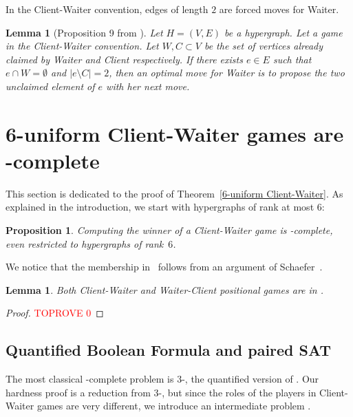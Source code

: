 \documentclass{article}
\newcommand{\PS}{\lang{Paired~SAT}\xspace}
\newcommand{\hyp}{H}
\newcommand{\WS}{E}
\newcommand{\som}{V}
\newcommand{\hxf}{\hyp = (\som, \WS)}
\newcommand{\QBF}{\lang{QBF}\xspace}
\newcommand{\hedges}{edges\xspace}
\newtheorem{lemma}[theorem]{Lemma}
\newtheorem{proposition}[theorem]{Proposition}
\begin{document}
In the Client-Waiter convention, \hedges of length \(2\) are forced moves for Waiter.

\begin{lemma}[Proposition 9 from \cite{CMP09}]
\label{lem:size2hyperedge}
Let $\hxf$ be a hypergraph. Let a game in the Client-Waiter convention. Let $W,C \subset \som$ be the set of vertices already claimed by Waiter and Client respectively. If there exists $e\in \WS$ such that $e \cap W = \emptyset$ and $|e \setminus C| = 2$, then an optimal move for Waiter is to propose the two unclaimed element of $e$ with her next move.
\end{lemma}














\section{6-uniform Client-Waiter games are \PSPACE-complete} \label{sec: 6unif client-waiter}

This section is dedicated to the proof of Theorem~\ref{6-uniform Client-Waiter}. As explained in the introduction, we start with hypergraphs of rank at most \(6\):
\begin{proposition}\label{prop: Client-Waiter pspace complete}
    Computing the winner of a Client-Waiter game is \PSPACE-complete, even restricted to hypergraphs of rank~$6$.
\end{proposition}

We notice that the membership in \PSPACE\ follows from an argument of Schaefer~\cite{Sch78}.
\begin{lemma}\label{lemma: in pspace}
     Both Client-Waiter and Waiter-Client positional games are in \PSPACE{}.
\end{lemma}

\begin{proof}\textcolor{red}{TOPROVE 0}\end{proof}

\subsection{Quantified Boolean Formula and paired SAT}
\label{sec:PairedSAT}

The most classical \PSPACE-complete problem is 3-\QBF, the quantified version of \SAT. Our hardness proof is a reduction from \(3\)-\QBF, but since the roles of the players in Client-Waiter games are very different, we introduce an intermediate problem \PS.
\end{document}
